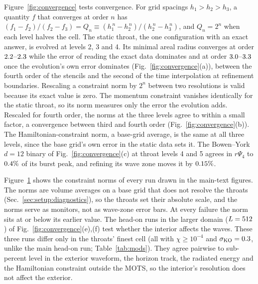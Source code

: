 \documentclass[twocolumn,floatfix,aps,prd,superscriptaddress,nofootinbib,showkeys]{revtex4-2}
\begin{document}
\begin{figure}[t]
\label{fig:constraints}
\end{figure}

Figure~\ref{fig:convergence} tests convergence. For grid spacings $h_1>h_2>h_3$, a quantity $f$ that converges at order $n$ has $(f_1-f_2)/(f_2-f_3)=Q_n\equiv(h_1^{\,n}-h_2^{\,n})/(h_2^{\,n}-h_3^{\,n})$, and $Q_n=2^n$ when each level halves the cell. The static throat, the one configuration with an exact answer, is evolved at levels 2, 3 and 4. Its minimal areal radius converges at order $2.2$--$2.3$ while the error of reading the exact data dominates and at order $3.0$--$3.3$ once the evolution's own error dominates (Fig.~\ref{fig:convergence}(a)), between the fourth order of the stencils and the second of the time interpolation at refinement boundaries. Rescaling a constraint norm by $2^n$ between two resolutions is valid because its exact value is zero. The momentum constraint vanishes identically for the static throat, so its norm measures only the error the evolution adds. Rescaled for fourth order, the norms at the three levels agree to within a small factor, a convergence between third and fourth order (Fig.~\ref{fig:convergence}(b)). The Hamiltonian-constraint norm, a base-grid average, is the same at all three levels, since the base grid's own error in the static data sets it. The Bowen--York $d=12$ binary of Fig.~\ref{fig:convergence}(c) at throat levels 4 and 5 agrees in $r\Psi_4$ to $0.4\%$ of its burst peak, and refining its wave zone moves it by $0.15\%$.

Figure~\ref{fig:constraints} shows the constraint norms of every run drawn in the main-text figures. The norms are volume averages on a base grid that does not resolve the throats (Sec.~\ref{sec:setup:diagnostics}), so the throats set their absolute scale, and the norms serve as monitors, not as wave-zone error bars. At every failure the norm sits at or below its earlier value. The head-on runs in the larger domain ($L=512$) of Fig.~\ref{fig:convergence}(e),(f) test whether the interior affects the waves. These three runs differ only in the throats' finest cell (all with $\chi\ge10^{-4}$ and $\sigma_{\rm KO}=0.3$, unlike the main head-on run; Table~\ref{tab:mods}). They agree pairwise to sub-percent level in the exterior waveform, the horizon track, the radiated energy and the Hamiltonian constraint outside the MOTS, so the interior's resolution does not affect the exterior.
\end{document}
